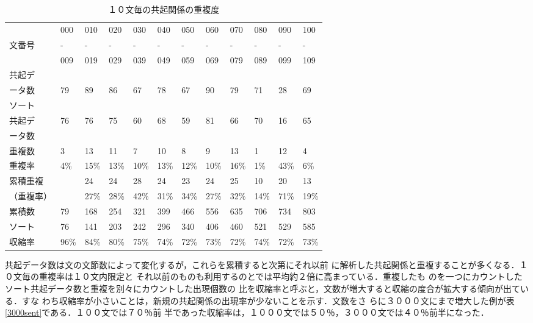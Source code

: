 \begin{table}[htb] \caption{１０文毎の共起関係の重複度}
\label{10sent}
\begin{center}
\begin{tabular}{|l|l|l|l|l|l|l|l|l|l|l|l|}
\hline
　　　&000&010 &020 &030&040&050&060&070&080&090&100\\
文番号& - & - & - & - & - & - & - & - & - & - & - \\
　　　&009&019&029&039&049&059&069&079&089&099&109\\ \hline
共起デ& & & & & & & & & & &\\
ータ数&79&89&86&67&78&67&90&79&71&28&69\\ \hline
ソート& & & & & & & & & & &\\
共起デ&76&76&75&60&68&59&81&66&70&16&65\\
ータ数& & & & & & & & & & &\\ \hline
重複数&3&13&11&7&10&8&9&13&1&12 &4\\
重複率&4\%&15\%&13\%&10\%&13\%&12\%&10\%&16\%&1\%&43\%&6\%\\ \hline
累積重複 & &24 &24&28&24 &23&24 &25&10&20&13\\
（重複率）& &27\%&28\%&42\%&31\%&34\%&27\%&32\%&14\%&71\%&19\%\\ \hline
累積数&79&168&254&321&399&466&556&635&706&734&803\\
ソート&76&141&203&242&296&340&406&460&521&529&585\\
収縮率&96\%&84\%&80\%&75\%&74\%&72\%&73\%&72\%&74\%&72\%&73\%\\ \hline
\end{tabular}
\end{center}
\end{table}

共起データ数は文の文節数によって変化するが，これらを累積すると次第にそれ以前
に解析した共起関係と重複することが多くなる．１０文毎の重複率は１０文内限定と
それ以前のものも利用するのとでは平均約２倍に高まっている．重複したも
のを一つにカウントしたソート共起データ数と重複を別々にカウントした出現個数の
比を収縮率と呼ぶと，文数が増大すると収縮の度合が拡大する傾向が出ている．すな
わち収縮率が小さいことは，新規の共起関係の出現率が少ないことを示す．文数をさ
らに３０００文にまで増大した例が表\ref{3000sent}である．１００文では７０％前
半であった収縮率は，１０００文では５０％，３０００文では４０％前半になった．

